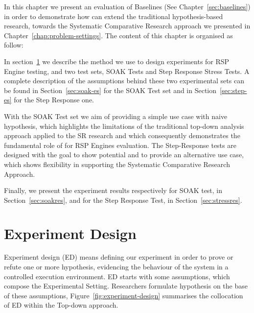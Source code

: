 In this chapter we present an evaluation of \name Baselines (See Chapter~\ref{sec:baselines}) in order to demonstrate how \name can extend the traditional hypothesis-based research, towards the Systematic Comparative Research approach we presented in Chapter~\ref{chap:problem-settings}. The content of this chapter is organised as follow:

In section~\ref{sec:experiment-design} we describe the method we use to design experiments for RSP Engine testing, and two test sets, SOAK Tests and Step Response Stress Tests. A complete description of the assumptions behind these two experimental sets can be found in Section~\ref{sec:soak-es} for the SOAK Test set and in Section~\ref{sec:step-es} for the Step Response one. 

With the SOAK Test set we aim of providing a simple use case with naive hypothesis, which highlights the limitations of the traditional top-down analysis approach applied to the SR research and which consequently demonstrates the fundamental role of \name  for RSP Engines evaluation.  The Step-Response tests are designed with the goal to show \name potential and to provide an alternative use case, which shows \name flexibility in supporting the Systematic Comparative Research Approach.

Finally, we present the experiment results respectively for SOAK test, in Section~\ref{sec:soakres}, and for the Step Response Test, in Section~\ref{sec:stressres}.

\section{Experiment Design}\label{sec:experiment-design}

Experiment design (ED) means defining our experiment in order to prove or refute one or more hypothesis, evidencing the behaviour of the system in a controlled execution environment. ED starts with some assumptions, which compose the  Experimental Setting. Researchers formulate hypothesis on the base of these assumptions, Figure~\ref{fig:experiment-design} summarises the collocation of ED within the Top-down approach.

